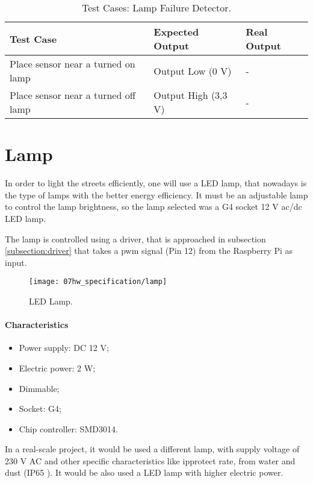 \begin{table}[H]
	\centering
	\resizebox{\columnwidth}{!}
	{
		\begin{tabular}{|m{3cm}|m{5cm}||m{5cm}|}
			\hline
			\textbf{Test Case} & \textbf{Expected Output} & \textbf{Real Output}
			\\\hline\hline
			Place sensor near a turned on lamp & Output Low (0 V) & - 
			\\\hline
			
			Place sensor near a turned off lamp  & Output High (3,3 V) & - 
			\\\hline
		\end{tabular}
	}
	\caption{Test Cases: Lamp Failure Detector.}
	\label{table:test_lampfail}
\end{table}

\section{Lamp}

In order to light the streets efficiently, one will use a LED lamp, that nowadays is the type of lamps with the better energy efficiency. It must be an adjustable lamp to control the lamp brightness, so the lamp selected was a G4 socket 12 V \ac{ac}/\ac{dc} LED lamp.

The lamp is controlled using a driver, that is approached in subsection \ref{subsection:driver} that takes a \ac{pwm} signal (Pin 12) from the Raspberry Pi as input. 

\begin{figure}[H]
	\centering
	\texttt{[image: 07hw\_specification/lamp]}
	\caption{LED Lamp.}
	\label{fig:lamp}
\end{figure}

\paragraph*{Characteristics}
\begin{itemize}
	\item Power supply: DC 12 V;
	\item Electric power: 2 W;
	\item Dimmable;
	\item Socket: G4;   
	\item Chip controller: SMD3014.
\end{itemize}

In a real-scale project, it would be used a different lamp, with supply voltage of 230 V AC and other specific characteristics  like \ac{ipprotect} rate, from water and dust (IP65 \cite{ip65}). It would be also used a LED lamp with higher electric power. 


